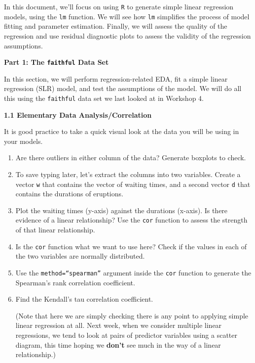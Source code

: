 \documentclass[11pt,a4paper]{article}
\begin{document}

\setcounter{section}{1}



In this document, we'll focus on using \texttt{R} to generate simple linear regression models, using the \texttt{lm} function. We will see how \texttt{lm} simplifies the process of model fitting and parameter estimation. Finally, we will assess the quality of the regression and use residual diagnostic plots to assess the validity of the regression assumptions.

\vspace{0.2cm}
\textbf{Part 1: The \texttt{faithful} Data Set}
\vspace{0.2cm}

In this section, we will perform regression-related EDA, fit a simple linear regression (SLR) model, and test the assumptions of the model. We will do all this using the \texttt{faithful} data set we last looked at in Workshop 4.

\vspace{0.2cm}

\textbf{1.1 Elementary Data Analysis/Correlation}

It is good practice to take a quick visual look at the data you will be using in your models.
\begin{enumerate}
\item Are there outliers in either column of the data? Generate boxplots to check.
\item To save typing later, let’s extract the columns into two variables. Create a vector \texttt{w} that contains the vector of waiting times, and a second vector \texttt{d} that contains the durations of eruptions.
\item Plot the waiting times (y-axis) against the durations (x-axis). Is there evidence of a linear relationship? Use the \texttt{cor} function to assess the strength of that linear relationship.
\item Is the \texttt{cor} function what we want to use here? Check if the values in each of the two variables are normally distributed.
\item Use the \texttt{method=``spearman''} argument inside the \texttt{cor} function to generate the Spearman's rank correlation coefficient.
\item Find the Kendall's tau correlation coefficient.

(Note that here we are simply checking there is any point to applying simple linear regression at all. Next week, when we consider multiple linear regressions, we tend to look at pairs of predictor variables using a scatter diagram, this time hoping we \textbf{don't} see much in the way of a linear relationship.)
\end{enumerate} 
\end{document}
